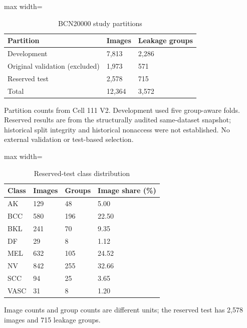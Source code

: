 \begin{table}[t]
\centering
\small
\caption{BCN20000 study partitions}
\label{tab:01-dataset-partitions}
\begin{adjustbox}{max width=\textwidth}
\begin{tabular}{lll}
\toprule
\textbf{Partition} & \textbf{Images} & \textbf{Leakage groups} \\
\midrule
Development & 7,813 & 2,286 \\
Original validation (excluded) & 1,973 & 571 \\
Reserved test & 2,578 & 715 \\
Total & 12,364 & 3,572 \\
\bottomrule
\end{tabular}
\end{adjustbox}
\par\smallskip
\begin{minipage}{\textwidth}\footnotesize Partition counts from Cell 111 V2. Development used five group-aware folds. Reserved results are from the structurally audited same-dataset snapshot; historical split integrity and historical nonaccess were not established. No external validation or test-based selection.\end{minipage}
\end{table}

\begin{table}[t]
\centering
\small
\caption{Reserved-test class distribution}
\label{tab:02-reserved-class-support}
\begin{adjustbox}{max width=\textwidth}
\begin{tabular}{llll}
\toprule
\textbf{Class} & \textbf{Images} & \textbf{Groups} & \textbf{Image share (\%)} \\
\midrule
AK & 129 & 48 & 5.00 \\
BCC & 580 & 196 & 22.50 \\
BKL & 241 & 70 & 9.35 \\
DF & 29 & 8 & 1.12 \\
MEL & 632 & 105 & 24.52 \\
NV & 842 & 255 & 32.66 \\
SCC & 94 & 25 & 3.65 \\
VASC & 31 & 8 & 1.20 \\
\bottomrule
\end{tabular}
\end{adjustbox}
\par\smallskip
\begin{minipage}{\textwidth}\footnotesize Image counts and group counts are different units; the reserved test has 2,578 images and 715 leakage groups.\end{minipage}
\end{table}

